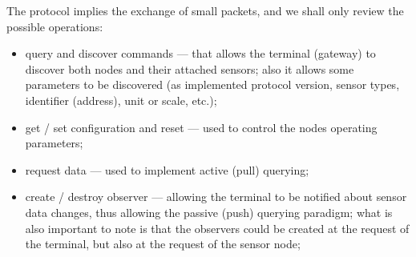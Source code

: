 The protocol implies the exchange of small packets, and we shall only review the possible operations:
\begin{itemize}
	\item query and discover commands --- that allows the terminal (gateway) to discover both nodes and their attached sensors; also it allows some parameters to be discovered (as implemented protocol version, sensor types, identifier (address), unit or scale, etc.);
	\item get / set configuration and reset --- used to control the nodes operating parameters;
	\item request data --- used to implement active (pull) querying;
	\item create / destroy observer --- allowing the terminal to be notified about sensor data changes, thus allowing the passive (push) querying paradigm; what is also important to note is that the observers could be created at the request of the terminal, but also at the request of the sensor node;
\end{itemize}

